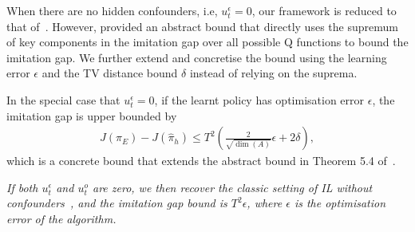 When there are no hidden confounders, i.e, $u^\epsilon_t=0$, our framework is reduced to that of~\citet{Swamy2022}. However, \citet{Swamy2022} provided an abstract bound that directly uses the supremum of key components in the imitation gap over all possible Q functions to bound the imitation gap. We further extend and concretise the bound using the learning error $\epsilon$ and the TV distance bound $\delta$ instead of relying on the suprema.


\begin{corollary}\label{corollary:unconfounded}
In the special case that $u^\epsilon_t=0$, if the learnt policy has optimisation error $\epsilon$,  the imitation gap is upper bounded by
\begin{align*}
    J(\pi_E)-J(\hat{\pi}_h)\leq T^2\left(\frac{2}{\sqrt{\dim(A)}}\epsilon+2\delta \right),
\end{align*}
which is a concrete bound that extends the abstract bound in Theorem 5.4 of~\cite{Swamy2022}.
\end{corollary}

\begin{remark}
\emph{If both $u^\epsilon_t$ and $u^o_t$ are zero, we then recover the classic setting of IL without confounders~\citep{Ross2010}, and the imitation gap bound is $T^2\epsilon$, where $\epsilon$ is the optimisation error of the algorithm.}
\end{remark}